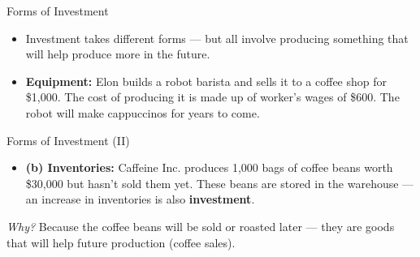 \documentclass[10pt,aspectratio=169]{beamer}
\begin{document}
\begin{frame}{ Forms of Investment}
\begin{itemize}
    \item Investment takes different forms — but all involve producing something that will help produce more in the future.
    \vspace{0.5em}
    \item[\textbf{(a)}] \textbf{Equipment:}  
    Elon builds a robot barista and sells it to a coffee shop for \$1,000.  The cost of producing it is made up of worker's wages of \$600.
    The robot will make cappuccinos for years to come.
\end{itemize}

\vspace{0.3em}
\begin{table}
\end{table}


\end{frame}

\begin{frame}{Forms of Investment (II)}

\begin{itemize}
\item \textbf{(b) Inventories:}  
Caffeine Inc. produces 1,000 bags of coffee beans worth \$30,000 but hasn’t sold them yet.  
These beans are stored in the warehouse — an increase in inventories is also \textbf{investment}.  
\end{itemize}

\textit{Why?}  
Because the coffee beans will be sold or roasted later — they are goods that will help future production (coffee sales).

\begin{table}
\end{table}

\end{frame}
\end{document}
